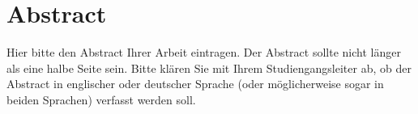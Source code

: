 \chapter*{Abstract} 
Hier bitte den Abstract Ihrer Arbeit eintragen. Der Abstract sollte nicht länger als eine halbe Seite sein. Bitte klären Sie mit Ihrem Studiengangsleiter ab, ob der Abstract in englischer oder deutscher Sprache (oder möglicherweise sogar in beiden Sprachen) verfasst werden soll.
